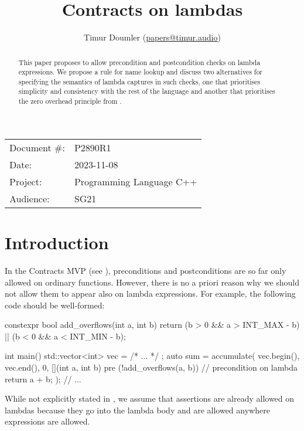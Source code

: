 


\title{Contracts on lambdas}
\author{ Timur Doumler \small(\href{mailto:papers@timur.audio}{papers@timur.audio})}
\date{}
\maketitle

\begin{tabular}{ll}
Document \#: & P2890R1 \\
Date: &2023-11-08 \\
Project: & Programming Language C++ \\
Audience: & SG21
\end{tabular}

\begin{abstract}
This paper proposes to allow precondition and postcondition checks on lambda expressions. We propose a rule for name lookup and discuss two alternatives for specifying the semantics of lambda captures in such checks, one that prioritises simplicity and consistency with the rest of the language and another that prioritises the zero overhead principle from \cite{P2932R1}.
\end{abstract}

\section{Introduction}
\label{sec:intro}

In the Contracts MVP (see \cite{P2900R1}), preconditions and postconditions are so far only allowed on ordinary functions. However, there is no a priori reason why we should not allow them to appear also on lambda expressions. For example, the following code should be well-formed:
\begin{codeblock}
constexpr bool add_overflows(int a, int b) {
  return (b > 0 && a > INT_MAX - b) || (b < 0 && a < INT_MIN - b);
}

int main() {
  std::vector<int> vec = { /* ... */ };
  auto sum = accumulate(
    vec.begin(), vec.end(), 0, 
    [](int a, int b) 
      pre (!add_overflows(a, b))  // precondition on lambda
    {
      return a + b;
    });
  // ...
}
\end{codeblock}

While not explicitly stated in \cite{P2900R1}, we assume that assertions are already allowed on lambdas because they go into the lambda body and are allowed anywhere expressions are allowed.

